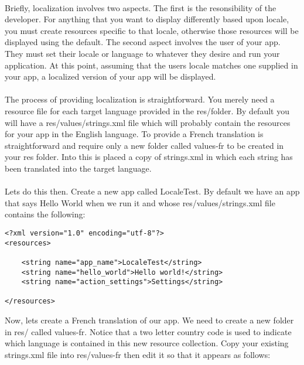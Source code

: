 \paragraph{} Briefly, localization involves two aspects. The first is the resonsibility of the developer. For anything that you want to display differently based upon locale, you must create resources specific to that locale, otherwise those resources will be displayed using the default. The second aspect involves the user of your app. They must set their locale or language to whatever they desire and run your application. At this point, assuming that the users locale matches one supplied in your app, a localized version of your app will be displayed.

\paragraph{} The process of providing localization is straightforward. You merely need a resource file for each target language provided in the res/folder. By default you will have a res/values/strings.xml file which will probably contain the resources for your app in the English language. To provide a French translation is straightforward and require only a new folder called values-fr to be created in your res folder. Into this is placed a copy of strings.xml in which each string has been translated into the target language.

\paragraph{} Lets do this then. Create a new app called LocaleTest. By default we have an app that says Hello World when we run it and whose res/values/strings.xml file contains the following:

\begin{lstlisting}
<?xml version="1.0" encoding="utf-8"?>
<resources>

    <string name="app_name">LocaleTest</string>
    <string name="hello_world">Hello world!</string>
    <string name="action_settings">Settings</string>

</resources>
\end{lstlisting}

Now, lets create a French translation of our app. We need to create a new folder in res/ called values-fr. Notice that a two letter country code is used to indicate which language is contained in this new resource collection. Copy your existing strings.xml file into res/values-fr then edit it so that it appears as follows:

